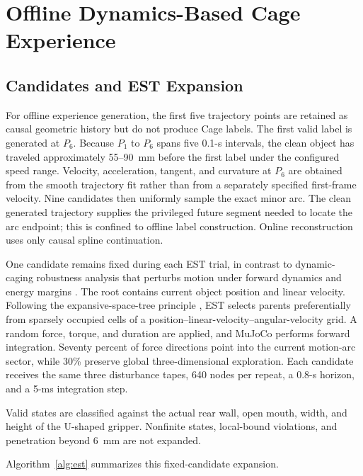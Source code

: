 \documentclass[conference]{IEEEtran}
\begin{document}
\section{Offline Dynamics-Based Cage Experience}

\subsection{Candidates and EST Expansion}

For offline experience generation, the first five trajectory points are retained as causal geometric history but do not produce Cage labels. The first valid label is generated at \(P_6\). Because \(P_1\) to \(P_6\) spans five 0.1-s intervals, the clean object has traveled approximately 55--90~mm before the first label under the configured speed range. Velocity, acceleration, tangent, and curvature at \(P_6\) are obtained from the smooth trajectory fit rather than from a separately specified first-frame velocity. Nine candidates then uniformly sample the exact minor arc. The clean generated trajectory supplies the privileged future segment needed to locate the arc endpoint; this is confined to offline label construction. Online reconstruction uses only causal spline continuation.

One candidate remains fixed during each EST trial, in contrast to dynamic-caging robustness analysis that perturbs motion under forward dynamics and energy margins \cite{dong2024caging}. The root contains current object position and linear velocity. Following the expansive-space-tree principle \cite{hsu1997}, EST selects parents preferentially from sparsely occupied cells of a position--linear-velocity--angular-velocity grid. A random force, torque, and duration are applied, and MuJoCo performs forward integration. Seventy percent of force directions point into the current motion-arc sector, while 30\% preserve global three-dimensional exploration. Each candidate receives the same three disturbance tapes, 640 nodes per repeat, a 0.8-s horizon, and a 5-ms integration step.

Valid states are classified against the actual rear wall, open mouth, width, and height of the U-shaped gripper. Nonfinite states, local-bound violations, and penetration beyond 6~mm are not expanded.

Algorithm~\ref{alg:est} summarizes this fixed-candidate expansion.
\end{document}
